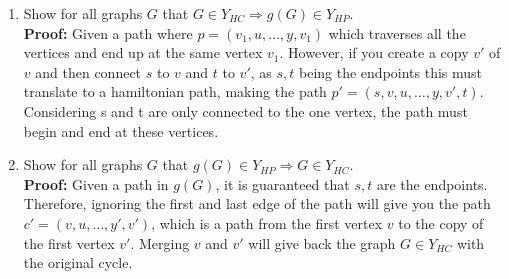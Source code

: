 \documentclass[11pt,a4paper]{article}
\newcommand{\hc} {HC}
\newcommand{\hp} {HP}
\begin{document}
\begin{enumerate}
\begin{enumerate}
\begin{center}
\begin{tikzpicture}[scale=0.5]
        \end{tikzpicture}\\
    \end{center}
        \item Show for all graphs $G$ that $G \in Y_{\hc{}} \Rightarrow g(G) \in Y_{\hp{}}$.\\
        \textbf{Proof:} Given a path where $p = (v_1, u, \dots, y, v_1)$ which traverses all the vertices and end up at the same vertex $v_1$. 
         However, if you create a copy $v'$ of $v$ and then connect $s$ to $v$ and $t$ to $v'$, as $s, t$ being the endpoints this must translate to a hamiltonian path,
         making the path $p' = (s,v,u,\ldots , y, v', t)$. Considering s and t are only connected to the one vertex, the path must begin and end at these vertices.\\
        \item Show for all graphs $G$ that $g(G) \in Y_{\hp{}} \Rightarrow G \in Y_{\hc{}}$.\\
        \textbf{Proof:} Given a path in $g(G)$, it is guaranteed that $s, t$ are the endpoints. Therefore, ignoring the first and last edge of the path will give you the path $c' = (v,u,\ldots , y', v')$, which is a path from the first vertex $v$  to the copy of the first vertex $v'$. Merging $v$ and $v'$ will give back the graph $G \in Y_{\hc}$ with the original cycle. 
    \end{enumerate}
\end{enumerate}
\end{document}
